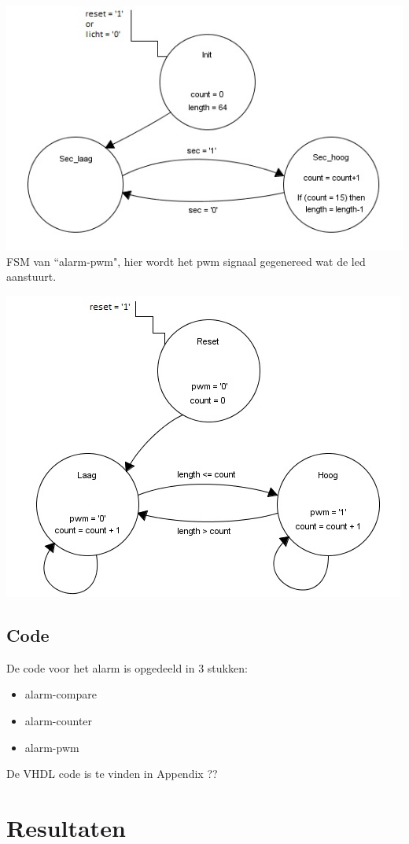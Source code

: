 \includegraphics[width=\textwidth,height=\textheight,keepaspectratio]{FSM/alarm-count-fsm.jpg}
\newpage
FSM van ``alarm-pwm", hier wordt het pwm signaal gegenereed wat de led aanstuurt.

\includegraphics[width=\textwidth,height=\textheight,keepaspectratio]{FSM/alarm-pwm-fsm.jpg}
\subsection{Code}
De code voor het alarm is opgedeeld in 3 stukken:
\begin{itemize}[nolistsep]
\item alarm-compare
\item alarm-counter
\item alarm-pwm
\end{itemize}
De VHDL code is te vinden in Appendix ??
\section{Resultaten}
